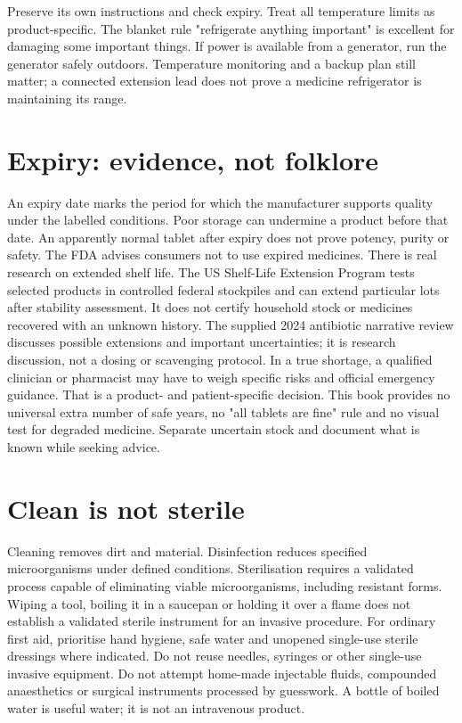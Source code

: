 \documentclass[10pt,openright]{book}
\begin{document}
Preserve its own instructions and check expiry. Treat all temperature limits as product-specific. The blanket rule "refrigerate anything important" is excellent for damaging some important things. If power is available from a generator, run the generator safely outdoors. Temperature monitoring and a backup plan still matter; a connected extension lead does not prove a medicine refrigerator is maintaining its range.

\section*{Expiry: evidence, not folklore}
An expiry date marks the period for which the manufacturer supports quality under the labelled conditions. Poor storage can undermine a product before that date. An apparently normal tablet after expiry does not prove potency, purity or safety. The FDA advises consumers not to use expired medicines. There is real research on extended shelf life. The US Shelf-Life Extension Program tests selected products in controlled federal stockpiles and can extend particular lots after stability assessment. It does not certify household stock or medicines recovered with an unknown history. The supplied 2024 antibiotic narrative review discusses possible extensions and important uncertainties; it is research discussion, not a dosing or scavenging protocol. In a true shortage, a qualified clinician or pharmacist may have to weigh specific risks and official emergency guidance. That is a product- and patient-specific decision. This book provides no universal extra number of safe years, no "all tablets are fine" rule and no visual test for degraded medicine. Separate uncertain stock and document what is known while seeking advice.

\section*{Clean is not sterile}
Cleaning removes dirt and material. Disinfection reduces specified microorganisms under defined conditions. Sterilisation requires a validated process capable of eliminating viable microorganisms, including resistant forms. Wiping a tool, boiling it in a saucepan or holding it over a flame does not establish a validated sterile instrument for an invasive procedure. For ordinary first aid, prioritise hand hygiene, safe water and unopened single-use sterile dressings where indicated. Do not reuse needles, syringes or other single-use invasive equipment. Do not attempt home-made injectable fluids, compounded anaesthetics or surgical instruments processed by guesswork. A bottle of boiled water is useful water; it is not an intravenous product.
\end{document}
